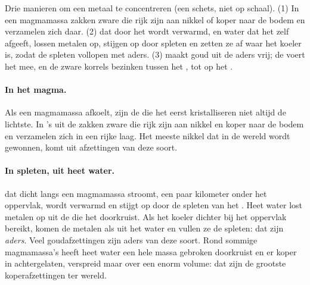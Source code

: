 \begin{omfigure}
{\small Drie manieren om een metaal te concentreren (een schets, niet op
schaal). (1) In een magmamassa zakken zware  die rijk zijn aan
nikkel of koper naar de bodem en verzamelen zich daar. (2)  dat
door het  wordt verwarmd, en water dat het  zelf afgeeft, lossen
metalen op, stijgen op door spleten en zetten ze af waar het 
koeler is, zodat de spleten vollopen met aders. (3)  maakt goud uit
de aders vrij; de  voert het mee, en de zware korrels bezinken tussen
het , tot op het .}
\label{fig:g9:earth-resources:deposits}
\end{omfigure}

\paragraph{In het magma.} Als een magmamassa afkoelt, zijn de  die
het eerst kristalliseren niet altijd de lichtste. In 's uit de 
zakken zware  die rijk zijn aan nikkel en koper naar de bodem en
verzamelen zich in een rijke laag. Het meeste nikkel dat in de wereld
wordt gewonnen, komt uit afzettingen van deze soort.

\paragraph{In spleten, uit heet water.}  dat dicht langs een
magmamassa stroomt, een paar kilometer onder het oppervlak, wordt
verwarmd en stijgt op door de spleten van het . Heet water lost
metalen op uit de  die het doorkruist. Als het koeler 
dichter bij het oppervlak bereikt, komen de metalen als  uit het
water en vullen ze de spleten: dat zijn \emph{aders}. Veel
goudafzettingen zijn aders van deze soort. Rond sommige magmamassa's heeft
heet water een hele massa gebroken  doorkruist en er koper in
achtergelaten, verspreid maar over een enorm volume: dat zijn de grootste
koperafzettingen ter wereld.

